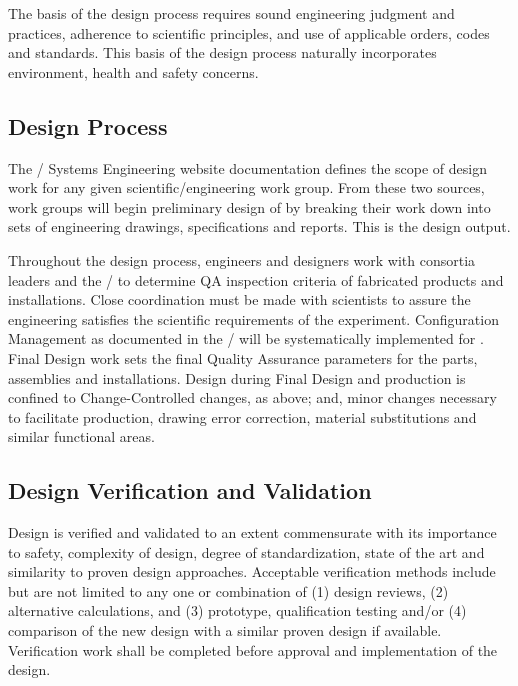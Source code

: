 The basis of the design process requires sound engineering judgment
and practices, adherence to scientific principles, and use of
applicable orders, codes and standards. This basis of the design
process naturally incorporates environment, health and safety
concerns.

\subsection{Design Process}

The / Systems Engineering website
documentation defines the scope of design work for any given
scientific/engineering work group. From these two sources, work groups
will begin preliminary design of  by breaking their work
down into sets of engineering drawings, specifications and
reports. This is the design output.

Throughout the design process, engineers and designers work with
consortia leaders and the /  to
determine QA inspection criteria of fabricated products and
installations. Close coordination must be made with 
scientists to assure the engineering satisfies the scientific
requirements of the experiment. Configuration Management as documented
in the /  will be
systematically implemented for . Final Design work sets
the final Quality Assurance parameters for the parts, assemblies and
installations. Design during Final Design and production is confined
to Change-Controlled changes, as above; and, minor changes necessary
to facilitate production, drawing error correction, material
substitutions and similar functional areas.

\subsection{Design Verification and Validation}
\label{sec:verification}

Design is verified and validated to an extent commensurate with its
importance to safety, complexity of design, degree of standardization,
state of the art and similarity to proven design
approaches. Acceptable verification methods include but are not
limited to any one or combination of (1) design reviews, (2)
alternative calculations, and (3) prototype, qualification testing
and/or (4) comparison of the new design with a similar proven design
if available. Verification work shall be completed before approval and
implementation of the design.

